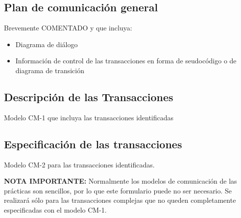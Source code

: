 \documentclass[12pt,a4paper,twoside,spanish]{article}      %
\begin{document}
\subsection{Plan de comunicación general}

Brevemente COMENTADO y que incluya:
\begin{itemize}
 \item Diagrama de diálogo
 \item Información de control de las transacciones en forma de
seudocódigo o de diagrama de transición
\end{itemize}

\subsection{Descripción de las Transacciones}
Modelo CM-1 que incluya las transacciones identificadas

\subsection{Especificación de las transacciones}

Modelo CM-2 para las transacciones identificadas.

\textbf{NOTA IMPORTANTE:} Normalmente los modelos de comunicación de las prácticas son sencillos, por lo que este formulario puede no ser necesario. Se realizará sólo
para las transacciones complejas que no queden completamente
especificadas con el modelo CM-1.

\end{document}
